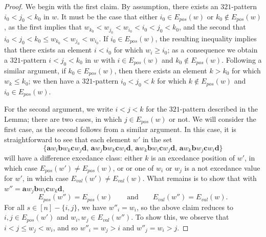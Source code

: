 \documentclass[12pt]{amsart}
\newcommand{\nantel}[1]{\todo[size=\tiny,color=blue!30]{#1 \\ \hfill --- Nantel}}
\theoremstyle{definition}
\theoremstyle{remark}
\numberwithin{equation}{section}
\renewcommand{\setminus}{-}
\newcommand{\EP}{E_{pos}}
\newcommand{\EV}{E_{val}}
\begin{document}
\begin{proof}
We begin with the first claim.  
By assumption, there exists an $321$-pattern $i_{0} < j_{0} < k_{0}$ in $w$.  
It must be the case that either $i_{0} \in \EP(w)$ or $k_{0} \notin \EP(w)$, as the first implies that $w_{k_{0}} < w_{j_{0}} < w_{i_{0}} < i_{0} < j_{0} < k_{0}$, and the second that $i_{0} < j_{0} < k_{0} \le w_{k_{0}} < w_{j_{0}} < w_{i_{0}}$. \nantel{I don't get this?}
If $i_{0} \in \EP(w)$, the resulting inequality implies that there exists an element $i < i_{0}$ for which $w_{i} \ge i_{0}$; as a consequence we obtain a $321$-pattern $i < j_{0} < k_{0}$ in $w$ with $i \in \EP(w)$ and $k_{0} \notin \EP(w)$.  
Following a similar argument, if $k_{0} \in \EP(w)$, then there exists an element $k > k_{0}$ for which $w_{k} \le k_{0}$; we then have a $321$-pattern $i_{0} < j_{0} < k$ for which $k \notin \EP(w)$ and $i_{0} \in \EP(w)$.

For the second argument, we write $i < j < k$ for the $321$-pattern described in the Lemma; there are two cases, in which $j \in \EP(w)$ or not.  We will consider the first case, as the second follows from a similar argument.  In this case, it is straightforward to see that each element $w'$ in the set
\[
\{
\mathbf{a}w_{i}\mathbf{b}w_{k}\mathbf{c}w_{j}\mathbf{d}, \,
\mathbf{a}w_{j}\mathbf{b}w_{k}\mathbf{c}w_{i}\mathbf{d}, \,
\mathbf{a}w_{k}\mathbf{b}w_{i}\mathbf{c}w_{j}\mathbf{d}, \,
\mathbf{a}w_{k}\mathbf{b}w_{j}\mathbf{c}w_{i}\mathbf{d}
\}
\]
will have a difference excedance class: either $k$ is an excedance position of $w'$, in which case $\EP(w') \neq \EP(w)$, or  or one of $w_{i}$ or $w_{j}$ is a not excedance value for $w'$, in which case $\EV(w') \neq \EV(w)$.  What remains is to show that with $w'' = \mathbf{a}w_{j}\mathbf{b}w_{i}\mathbf{c}w_{k}\mathbf{d}$, 
\[
\EP(w'') = \EP(w)
\qquad\text{and}\qquad
\EV(w'') = \EV(w).
\]
For all $s \in [n] \setminus \{i, j\}$, we have $w''_{i} = w_{i}$, so the above claim reduces to $i, j \in \EP(w')$ and $w_{i}, w_{j} \in \EV(w'')$.  To show this, we observe that $i < j \le w_{j} < w_{i}$, and so $w''_{i} = w_{j} > i$ and $w''_{j} = w_{i} > j$.
\end{proof}
\end{document}
